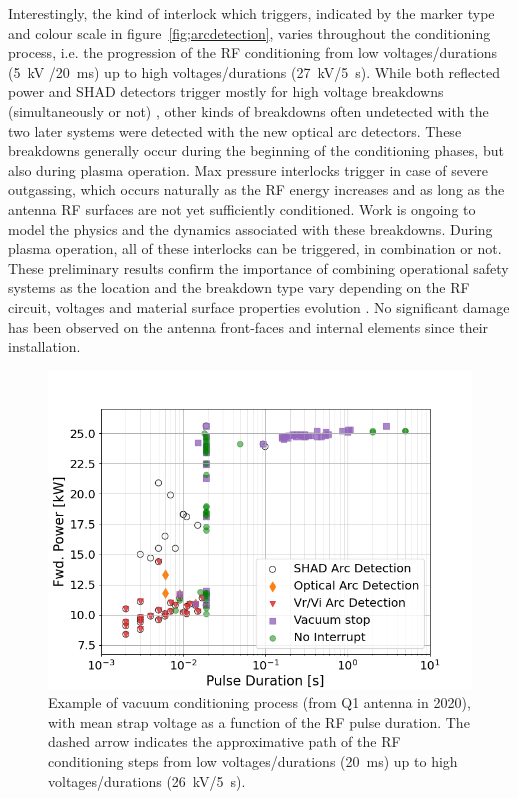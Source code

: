\documentclass[12p]{iopart}
\begin{document}
Interestingly, the kind of interlock which triggers, indicated by the marker type and colour scale in figure~\ref{fig;arcdetection}, varies throughout the conditioning process, i.e. the progression of the RF conditioning from low voltages/durations (\SI{5}{\kilo\volt} /\SI{20}{\milli\second}) up to high voltages/durations (\SI{27}{\kilo\volt}/\SI{5}{\second}). While both reflected power and SHAD detectors trigger mostly for high voltage breakdowns (simultaneously or not) \cite{dinca2011}, other kinds of breakdowns often undetected with the two later systems were detected with the new optical arc detectors. These breakdowns generally occur during the beginning of the conditioning phases, but also during plasma operation. Max pressure interlocks trigger in case of severe outgassing, which occurs naturally as the RF energy increases and as long as the antenna RF surfaces are not yet sufficiently conditioned. Work is ongoing to model the physics and the dynamics associated with these breakdowns. During plasma operation, all of these interlocks can be triggered, in combination or not. These preliminary results confirm the importance of combining operational safety systems as the location and the breakdown type vary depending on the RF circuit, voltages and material surface properties evolution \cite{dinca2011-1}. No significant damage has been observed on the antenna front-faces and internal elements since their installation. 

\begin{figure}
	\centering
	\includegraphics[width=0.95\linewidth]{figures/arc_detection}
	\caption{Example of vacuum conditioning process (from Q1 antenna in 2020), with mean strap voltage as a function of the RF pulse duration. The dashed arrow indicates the approximative path of the RF conditioning steps from low voltages/durations (\SI{20}{\milli\second}) up to high voltages/durations (\SI{26}{\kilo\volt}/\SI{5}{\second}).}
	\label{fig:arcdetection}
\end{figure}
\end{document}
